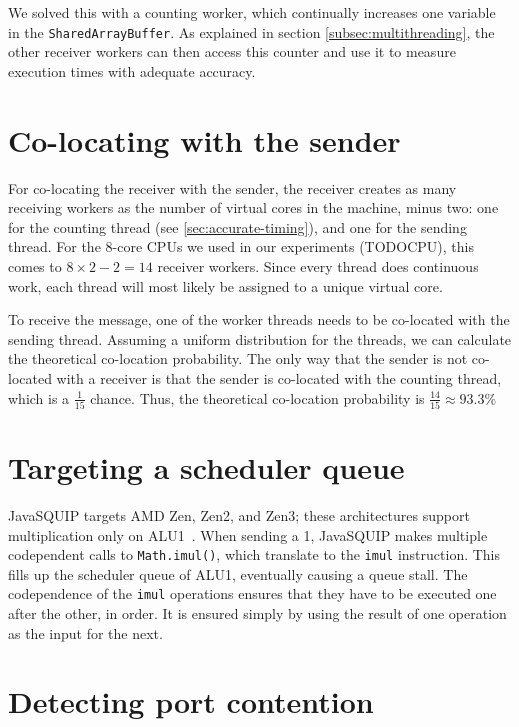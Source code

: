 \documentclass[11pt,
  titlepage=false,
]{scrreprt}
\begin{document}
We solved this with a counting worker, which continually increases one variable in the \texttt{SharedArrayBuffer}.
As explained in section \ref{subsec:multithreading}, the other receiver workers can then access this counter and use it to measure execution times with adequate accuracy.

\section{Co-locating with the sender}
\label{sec:co-location}
For co-locating the receiver with the sender, the receiver creates as many receiving workers as the number of virtual cores in the machine, minus two:
one for the counting thread (see \ref{sec:accurate-timing}), and one for the sending thread.
For the 8-core CPUs we used in our experiments (TODOCPU), this comes to $8 \times 2 - 2 = 14$ receiver workers.
Since every thread does continuous work, each thread will most likely be assigned to a unique virtual core.

To receive the message, one of the worker threads needs to be co-located with the sending thread.
Assuming a uniform distribution for the threads, we can calculate the theoretical co-location probability.
The only way that the sender is not co-located with a receiver is that the sender is co-located with the counting thread,
which is a $\frac{1}{15}$ chance.
Thus, the theoretical co-location probability is $\frac{14}{15} \approx 93.3\%$

\section{Targeting a scheduler queue}
JavaSQUIP targets AMD Zen, Zen2, and Zen3;
these architectures support multiplication only on ALU1~\cite{AMD2020OptimizationEPYC7003}.
When sending a 1, JavaSQUIP makes multiple codependent calls to \texttt{Math.imul()}, which translate to the \texttt{imul} instruction.
This fills up the scheduler queue of ALU1, eventually causing a queue stall.
The codependence of the \texttt{imul} operations ensures that they have to be executed one after the other, in order.
It is ensured simply by using the result of one operation as the input for the next.

\section{Detecting port contention}
\end{document}
